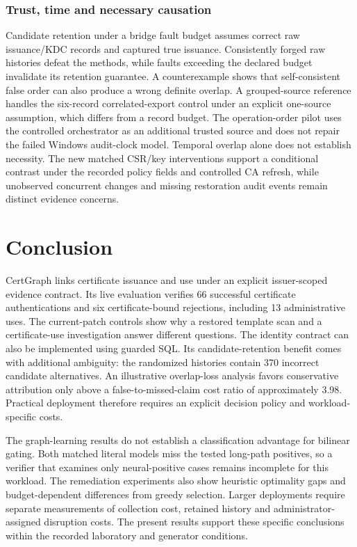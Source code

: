 \subsubsection{Trust, time and necessary causation}
 Candidate retention under a bridge fault budget assumes correct raw issuance/KDC records and captured true issuance. Consistently forged raw histories defeat the methods, while faults exceeding the declared budget invalidate its retention guarantee. A counterexample shows that self-consistent false order can also produce a wrong definite overlap. A grouped-source reference handles the six-record correlated-export control under an explicit one-source assumption, which differs from a record budget. The operation-order pilot uses the controlled orchestrator as an additional trusted source and does not repair the failed Windows audit-clock model. Temporal overlap alone does not establish necessity. The new matched CSR/key interventions support a conditional contrast under the recorded policy fields and controlled CA refresh, while unobserved concurrent changes and missing restoration audit events remain distinct evidence concerns.


\section{Conclusion}
\label{sec:conclusion}
CertGraph links certificate issuance and use under an explicit issuer-scoped evidence contract. Its live evaluation verifies 66 successful certificate authentications and six certificate-bound rejections, including 13 administrative uses. The current-patch controls show why a restored template scan and a certificate-use investigation answer different questions. The identity contract can also be implemented using guarded SQL. Its candidate-retention benefit comes with additional ambiguity: the randomized histories contain 370 incorrect candidate alternatives. An illustrative overlap-loss analysis favors conservative attribution only above a false-to-missed-claim cost ratio of approximately 3.98. Practical deployment therefore requires an explicit decision policy and workload-specific costs.

The graph-learning results do not establish a classification advantage for bilinear gating. Both matched literal models miss the tested long-path positives, so a verifier that examines only neural-positive cases remains incomplete for this workload. The remediation experiments also show heuristic optimality gaps and budget-dependent differences from greedy selection. Larger deployments require separate measurements of collection cost, retained history and administrator-assigned disruption costs. The present results support these specific conclusions within the recorded laboratory and generator conditions.

